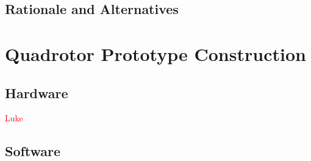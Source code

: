\documentclass{article}
\numberwithin{equation}{section} %
\begin{document}
\subsection{Rationale and Alternatives}

\section{Quadrotor Prototype Construction}


\subsection{Hardware}
\textcolor{red}{Luke}

\subsection{Software}
\end{document}
